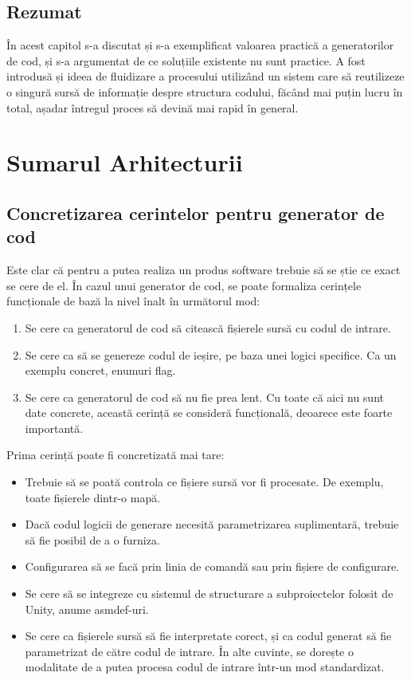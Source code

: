 \documentclass{report}
\begin{document}
\section{Rezumat}

În acest capitol s-a discutat și s-a exemplificat valoarea practică a generatorilor de cod, și s-a argumentat de ce soluțiile existente nu sunt practice.
A fost introdusă și ideea de fluidizare a procesului utilizând un sistem care să reutilizeze o singură sursă de informație despre structura codului, făcând mai puțin lucru în total, așadar întregul proces să devină mai rapid în general.

\chapter{Sumarul Arhitecturii}

\section{Concretizarea cerintelor pentru generator de cod}

Este clar că pentru a putea realiza un produs software trebuie să se știe ce exact se cere de el.
În cazul unui generator de cod, se poate formaliza cerințele funcționale de bază la nivel înalt în următorul mod:

\begin{enumerate}
  \item Se cere ca generatorul de cod să citească fișierele sursă cu codul de intrare.
  \item Se cere ca să se genereze codul de ieșire, pe baza unei logici specifice. Ca un exemplu concret, enumuri flag.
  \item Se cere ca generatorul de cod să nu fie prea lent.
        Cu toate că aici nu sunt date concrete, această cerință se consideră funcțională, deoarece este foarte importantă.
\end{enumerate}

Prima cerință poate fi concretizată mai tare:

\begin{itemize}
  \item Trebuie să se poată controla ce fișiere sursă vor fi procesate. De exemplu, toate fișierele dintr-o mapă.
  \item Dacă codul logicii de generare necesită parametrizarea suplimentară, trebuie să fie posibil de a o furniza.
  \item Configurarea să se facă prin linia de comandă sau prin fișiere de configurare.
  \item Se cere să se integreze cu sistemul de structurare a subproiectelor folosit de Unity, anume asmdef-uri.
  \item Se cere ca fișierele sursă să fie interpretate corect, și ca codul generat să fie parametrizat de către codul de intrare. În alte cuvinte, se dorește o modalitate de a putea procesa codul de intrare într-un mod standardizat.
\end{itemize}
\end{document}
